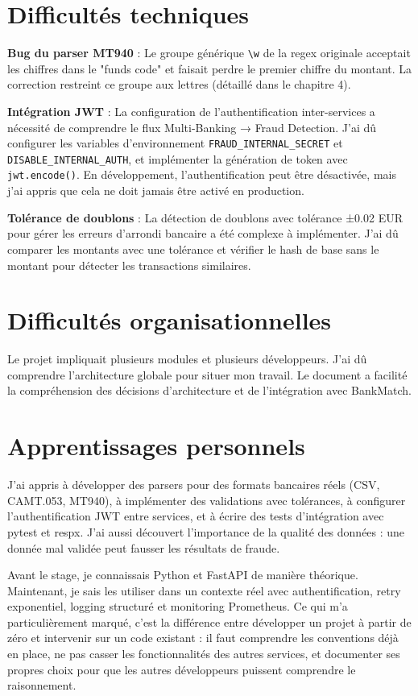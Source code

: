 \documentclass[12pt,a4paper]{extreport}
\begin{document}
\section{Difficultés techniques}

\textbf{Bug du parser MT940} : Le groupe générique \verb|\w| de la regex originale acceptait les chiffres dans le "funds code" et faisait perdre le premier chiffre du montant. La correction restreint ce groupe aux lettres (détaillé dans le chapitre 4).

\textbf{Intégration JWT} : La configuration de l'authentification inter-services a nécessité de comprendre le flux Multi-Banking → Fraud Detection. J'ai dû configurer les variables d'environnement \texttt{FRAUD\_INTERNAL\_SECRET} et \texttt{DISABLE\_INTERNAL\_AUTH}, et implémenter la génération de token avec \texttt{jwt.encode()}. En développement, l'authentification peut être désactivée, mais j'ai appris que cela ne doit jamais être activé en production.

\textbf{Tolérance de doublons} : La détection de doublons avec tolérance ±0.02 EUR pour gérer les erreurs d'arrondi bancaire a été complexe à implémenter. J'ai dû comparer les montants avec une tolérance et vérifier le hash de base sans le montant pour détecter les transactions similaires.

\section{Difficultés organisationnelles}

Le projet impliquait plusieurs modules et plusieurs développeurs. J'ai dû comprendre l'architecture globale pour situer mon travail. Le document  a facilité la compréhension des décisions d'architecture et de l'intégration avec BankMatch.

\section{Apprentissages personnels}

J'ai appris à développer des parsers pour des formats bancaires réels (CSV, CAMT.053, MT940), à implémenter des validations avec tolérances, à configurer l'authentification JWT entre services, et à écrire des tests d'intégration avec pytest et respx. J'ai aussi découvert l'importance de la qualité des données : une donnée mal validée peut fausser les résultats de fraude.

Avant le stage, je connaissais Python et FastAPI de manière théorique. Maintenant, je sais les utiliser dans un contexte réel avec authentification, retry exponentiel, logging structuré et monitoring Prometheus. Ce qui m'a particulièrement marqué, c'est la différence entre développer un projet à partir de zéro et intervenir sur un code existant : il faut comprendre les conventions déjà en place, ne pas casser les fonctionnalités des autres services, et documenter ses propres choix pour que les autres développeurs puissent comprendre le raisonnement.
\end{document}
